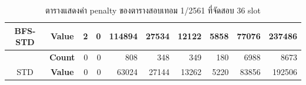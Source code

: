 \begin{table}[]
{\begin{tabular}{@{}ccrrrrrrrr@{}}
    \multirow{-2}{*}{BFS-STD}                    & \textbf{Value}                        & 2                              & 0                              & 114894                         & 27534                          & 12122                          & 5858                           & 77076                          & 237486                           \\ \midrule
    {\color[HTML]{FE0000} }                      & {\color[HTML]{FE0000} \textbf{Count}} & {\color[HTML]{FE0000} 0}       & {\color[HTML]{FE0000} 0}       & {\color[HTML]{FE0000} 808}     & {\color[HTML]{FE0000} 348}     & {\color[HTML]{FE0000} 349}     & {\color[HTML]{FE0000} 180}     & {\color[HTML]{FE0000} 6988}    & {\color[HTML]{FE0000} 8673}      \\ \cmidrule(l){2-10} 
    \multirow{-2}{*}{{\color[HTML]{FE0000} STD}} & {\color[HTML]{FE0000} \textbf{Value}} & {\color[HTML]{FE0000} 0}       & {\color[HTML]{FE0000} 0}       & {\color[HTML]{FE0000} 63024}   & {\color[HTML]{FE0000} 27144}   & {\color[HTML]{FE0000} 13262}   & {\color[HTML]{FE0000} 5220}    & {\color[HTML]{FE0000} 83856}   & {\color[HTML]{FE0000} 192506}    \\ \bottomrule
    \end{tabular}%
    }
    \caption{ตารางแสดงค่า penalty ของตารางสอบเทอม 1/2561 ที่จัดสอบ 36 slot}
    \label{tab:result_table_161_36}
\end{table}
